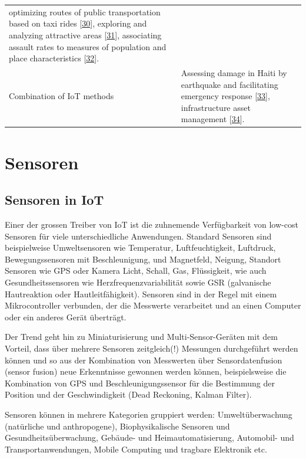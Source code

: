 \documentclass[
  11pt,
  a4paperpaper,
  oneside, openany  ,captions=tableheading
]{scrbook}
\theoremstyle{definition}
\theoremstyle{remark}
\begin{document}
\begin{longtable}[]{@{}
  >{\raggedright\arraybackslash}p{}
  >{\raggedright\arraybackslash}p{}@{}}
optimizing routes of public transportation based on taxi rides
{[}\href{https://www.mdpi.com/2220-9964/7/7/269\#B43-ijgi-07-00269}{30}{]},
exploring and analyzing attractive areas
{[}\href{https://www.mdpi.com/2220-9964/7/7/269\#B38-ijgi-07-00269}{31}{]},
associating assault rates to measures of population and place
characteristics
{[}\href{https://www.mdpi.com/2220-9964/7/7/269\#B41-ijgi-07-00269}{32}{]}. \\
Combination of IoT methods & Assessing damage in Haiti by earthquake and
facilitating emergency response
{[}\href{https://www.mdpi.com/2220-9964/7/7/269\#B61-ijgi-07-00269}{33}{]},
infrastructure asset management
{[}\href{https://www.mdpi.com/2220-9964/7/7/269\#B58-ijgi-07-00269}{34}{]}. \\
\end{longtable}

\chapter{Sensoren}\label{sensoren}

\section{Sensoren in IoT}\label{sensoren-in-iot}

Einer der grossen Treiber von IoT ist die zuhnemende Verfügbarkeit von
low-cost Sensoren für viele unterschiedliche Anwendungen. Standard
Sensoren sind beispielweise Umweltsensoren wie Temperatur,
Luftfeuchtigkeit, Luftdruck, Bewegungssensoren mit Beschleunigung, und
Magnetfeld, Neigung, Standort Sensoren wie GPS oder Kamera Licht,
Schall, Gas, Flüssigkeit, wie auch Gesundheitssensoren wie
Herzfrequenzvariabilität sowie GSR (galvanische Hautreaktion oder
Hautleitfähigkeit). Sensoren sind in der Regel mit einem Mikrocontroller
verbunden, der die Messwerte verarbeitet und an einen Computer oder ein
anderes Gerät überträgt.

Der Trend geht hin zu Miniaturisierung und Multi-Sensor-Geräten mit dem
Vorteil, dass über mehrere Sensoren zeitgleich(!) Messungen durchgeführt
werden können und so aus der Kombination von Messwerten über
Sensordatenfusion (sensor fusion) neue Erkenntnisse
gewonnen werden können, beispielsweise die Kombination von GPS und
Beschleunigungssensor für die Bestimmung der Position und der
Geschwindigkeit (Dead Reckoning, Kalman Filter).

Sensoren können in mehrere Kategorien gruppiert werden:
Umweltüberwachung (natürliche und anthropogene), Biophysikalische
Sensoren und Gesundheitsüberwachung, Gebäude- und Heimautomatisierung,
Automobil- und Transportanwendungen, Mobile Computing und tragbare
Elektronik etc.
\end{document}
